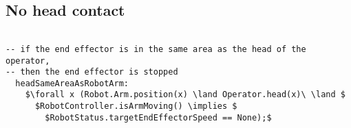\subsection{No head contact}

\begin{lstlisting}[fontadjust, mathescape, frame=single]

-- if the end effector is in the same area as the head of the operator, 
-- then the end effector is stopped
  headSameAreaAsRobotArm:
    $\forall x (Robot.Arm.position(x) \land Operator.head(x)\ \land $
      $RobotController.isArmMoving() \implies $
        $RobotStatus.targetEndEffectorSpeed == None);$

\end{lstlisting}
